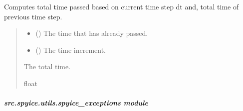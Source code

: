 \documentclass[a4paper,11pt,english,openany]{sphinxmanual}
\begin{document}
\begin{fulllineitems}
\label{\detokenize{api/spyice.utils.helpers:src.spyice.utils.helpers.t_total}}
\pysigstartsignatures
\pysiglinewithargsret
{}
{\sphinxparamcomma {}}
{}
\pysigstopsignatures
\sphinxAtStartPar
Computes total time passed based on current time step dt and, total time of previous time step.
\begin{quote}\begin{description}
\begin{itemize}
\item {} 
\sphinxAtStartPar
{} () \textendash{} The time that has already passed.

\item {} 
\sphinxAtStartPar
{} () \textendash{} The time increment.

\end{itemize}

\sphinxAtStartPar
The total time.

\sphinxAtStartPar
float

\end{description}\end{quote}

\end{fulllineitems}


\sphinxstepscope


\subparagraph{src.spyice.utils.spyice\_exceptions module}
\label{\detokenize{api/spyice.utils.spyice_exceptions:module-src.spyice.utils.spyice_exceptions}}\label{\detokenize{api/spyice.utils.spyice_exceptions:src-spyice-utils-spyice-exceptions-module}}\label{\detokenize{api/spyice.utils.spyice_exceptions::doc}}
\end{document}
